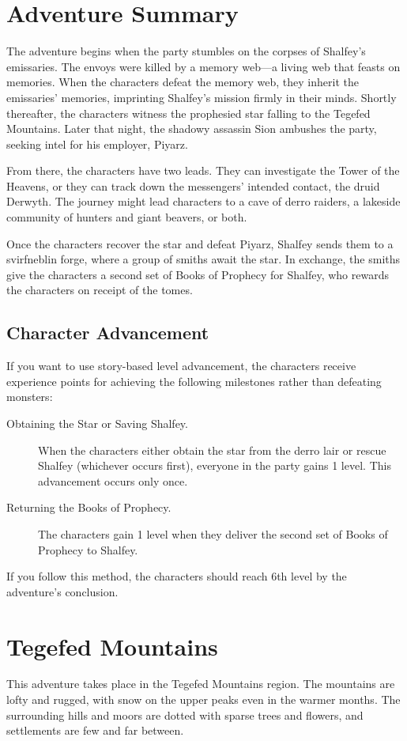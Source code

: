 \documentclass[10pt,a4paper,twoside,bg=print,twocolumn,openany,nodeprecatedcode]{dndbook}
\begin{document}
\section{Adventure Summary}
The adventure begins when the party stumbles on the corpses of Shalfey's emissaries. The envoys were killed by a memory web—a living web that feasts on memories. When the characters defeat the memory web, they inherit the emissaries' memories, imprinting Shalfey's mission firmly in their minds. Shortly thereafter, the characters witness the prophesied star falling to the Tegefed Mountains. Later that night, the shadowy assassin Sion ambushes the party, seeking intel for his employer, Piyarz.

From there, the characters have two leads. They can investigate the Tower of the Heavens, or they can track down the messengers' intended contact, the druid Derwyth. The journey might lead characters to a cave of derro raiders, a lakeside community of hunters and giant beavers, or both.

Once the characters recover the star and defeat Piyarz, Shalfey sends them to a svirfneblin forge, where a group of smiths await the star. In exchange, the smiths give the characters a second set of Books of Prophecy for Shalfey, who rewards the characters on receipt of the tomes.

\subsection{Character Advancement}
If you want to use story-based level advancement, the characters receive experience points for achieving the following milestones rather than defeating monsters:


\begin{description}
\item[Obtaining the Star or Saving Shalfey.]
When the characters either obtain the star from the derro lair or rescue Shalfey (whichever occurs first), everyone in the party gains 1 level. This advancement occurs only once.
\item[Returning the Books of Prophecy.]
The characters gain 1 level when they deliver the second set of Books of Prophecy to Shalfey.
\end{description}

If you follow this method, the characters should reach 6th level by the adventure's conclusion.

\section{Tegefed Mountains}
This adventure takes place in the Tegefed Mountains region. The mountains are lofty and rugged, with snow on the upper peaks even in the warmer months. The surrounding hills and moors are dotted with sparse trees and flowers, and settlements are few and far between.
\end{document}
